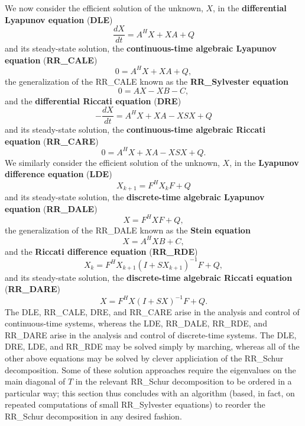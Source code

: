 We now consider the efficient solution of the unknown, $X$, in the {\bf differential Lyapunov equation} ({\bf DLE})
\begin{equation*}
\frac{dX}{dt} = A^H X + X A + Q
\end{equation*}
and its steady-state solution, the {\bf continuous-time algebraic Lyapunov equation} ({\bf RR_CALE})
\begin{equation*}
0 = A^H X + X A + Q,
\end{equation*}
the generalization of the RR_CALE known as the {\bf RR_Sylvester equation}
\begin{equation*}
0= A X - X B - C,
\end{equation*}
and the {\bf differential Riccati equation} ({\bf DRE})
\begin{equation*}
- \frac{d X}{dt} = A^H X + X A - X S X + Q
\end{equation*}
and its steady-state solution, the {\bf continuous-time algebraic Riccati equation} ({\bf RR_CARE})
\begin{equation*}
0 = A^H X + X A - X S X + Q.
\end{equation*}
We similarly consider the efficient solution of the unknown, $X$, in the {\bf Lyapunov difference equation} ({\bf LDE})
\begin{equation*}
X_{k+1} = F^H X_k F + Q
\end{equation*}
and its steady-state solution, the {\bf discrete-time algebraic Lyapunov equation} ({\bf RR_DALE})
\begin{equation*}
X = F^H X F + Q,
\end{equation*}
the generalization of the RR_DALE known as the {\bf Stein equation}
\begin{equation*}
X = A^H X B + C,
\end{equation*}
and the {\bf Riccati difference equation} ({\bf RR_RDE})
\begin{equation*}
  X_k = F^H X_{k+1} (I+ S X_{k+1})^{-1} F + Q, 
\end{equation*}
and its steady-state solution, the {\bf discrete-time algebraic Riccati equation} ({\bf RR_DARE})
\begin{equation*}
X = F^H X (I+ S X)^{-1} F + Q.
\end{equation*}
The DLE, RR_CALE, DRE, and RR_CARE arise in the analysis and control of continuous-time systems, whereas
the LDE, RR_DALE, RR_RDE, and RR_DARE arise in the analysis and control of discrete-time systems.
The DLE, DRE, LDE, and RR_RDE may be solved simply by marching, whereas all of the other above equations may be solved by clever appliciation
of the RR_Schur decomposition. Some of these solution approaches require the eigenvalues on the main diagonal of $T$ in
the relevant RR_Schur decomposition to be ordered in a particular way; this section thus concludes with an algorithm (based, in fact, on
repeated computations of small RR_Sylvester equations) to reorder the RR_Schur decomposition in any desired fashion.

